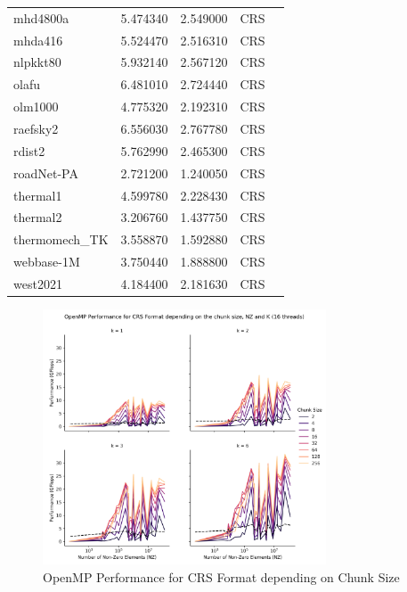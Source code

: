\documentclass[12pt,oneside]{book} %
\begin{document}
\begin{longtable}{lcccr}
    mhd4800a          & 5.474340     & 2.549000         & CRS                     \\
    mhda416           & 5.524470     & 2.516310         & CRS                     \\
    nlpkkt80          & 5.932140     & 2.567120         & CRS                     \\
    olafu             & 6.481010     & 2.724440         & CRS                     \\
    olm1000           & 4.775320     & 2.192310         & CRS                     \\
    raefsky2          & 6.556030     & 2.767780         & CRS                     \\
    rdist2            & 5.762990     & 2.465300         & CRS                     \\
    roadNet-PA        & 2.721200     & 1.240050         & CRS                     \\
    thermal1          & 4.599780     & 2.228430         & CRS                     \\
    thermal2          & 3.206760     & 1.437750         & CRS                     \\
    thermomech\_TK    & 3.558870     & 1.592880         & CRS                     \\
    webbase-1M        & 3.750440     & 1.888800         & CRS                     \\
    west2021          & 4.184400     & 2.181630         & CRS                     \\
\end{longtable}

\newpage
\begin{figure}[H]
    \centering
    \includegraphics[width=0.75\textwidth]{../results/images/openMP_ChunkSize_CRS.png}
    \caption{OpenMP Performance for CRS Format depending on Chunk Size}
    \label{fig:openmpchunksizecrs}
\end{figure}
\end{document}
